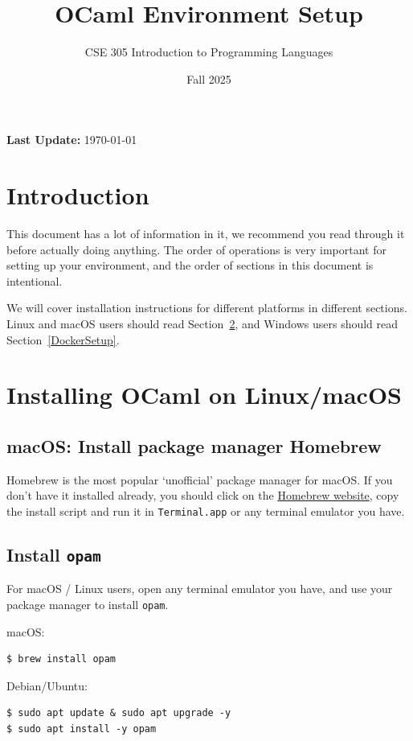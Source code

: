 \documentclass{extarticle}
\title{OCaml Environment Setup}
\author{CSE 305 Introduction to Programming Languages}
\date{Fall 2025}
\begin{document}
\maketitle
\begin{center}
\textbf{Last Update:} \today
\end{center}

\section{Introduction}\label{Intro}
This document has a lot of information in it, we recommend you read through it before actually doing anything.
The order of operations is very important for setting up your environment, and the order of sections in this document is intentional.

We will cover installation instructions for different platforms in different sections.
Linux and macOS users should read Section~\ref{MacLinuxInstall},
and Windows users should read Section~\ref{DockerSetup}.


\newpage
\section{Installing OCaml on Linux/macOS}\label{MacLinuxInstall}

\subsection{macOS: Install package manager Homebrew}
Homebrew is the most popular `unofficial' package manager for macOS\@.
If you don't have it installed already, you should click on the \href{https://brew.sh/}{Homebrew website},
copy the install script and run it in \texttt{Terminal.app} or any terminal emulator you have.

\subsection{Install \texttt{opam}}
For macOS / Linux users, open any terminal emulator you have,
and use your package manager to install \texttt{opam}.

macOS:
\begin{lstlisting}
$ brew install opam
\end{lstlisting}

Debian/Ubuntu:
\begin{lstlisting}
$ sudo apt update & sudo apt upgrade -y
$ sudo apt install -y opam
\end{lstlisting}
\end{document}
